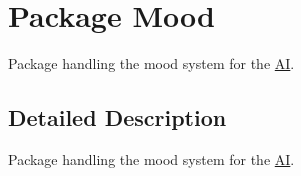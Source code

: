 \hypertarget{namespace_mood}{\section{Package Mood}
\label{namespace_mood}
}


Package handling the mood system for the \hyperlink{namespace_a_i}{A\-I}.  




\subsection{Detailed Description}
Package handling the mood system for the \hyperlink{namespace_a_i}{A\-I}. 